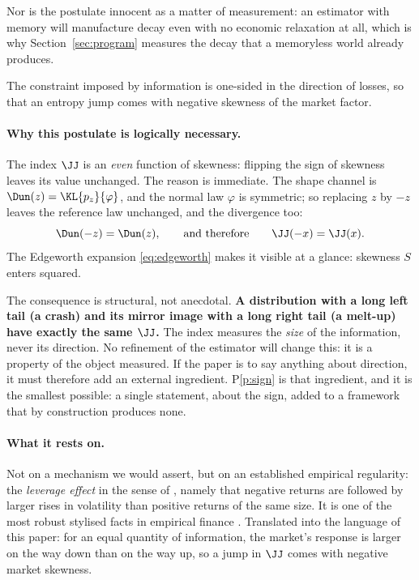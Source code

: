 Nor is the postulate innocent as a matter of measurement: an estimator with
memory will manufacture decay even with no economic relaxation at all, which is
why Section~\ref{sec:program} measures the decay that a memoryless world already
produces.

\begin{postulate}
\label{p:sign}
The constraint imposed by information is one-sided in the direction of losses,
so that an entropy jump comes with negative skewness of the market factor.
\end{postulate}

\paragraph{Why this postulate is logically necessary.} The index $\JJ$ is an
\emph{even} function of skewness: flipping the sign of skewness leaves its value
unchanged. The reason is immediate. The shape channel is
$\Dun(z)=\KL{p_z}{\varphi}$, and the normal law $\varphi$ is symmetric; so
replacing $z$ by $-z$ leaves the reference law unchanged, and the divergence too:
\begin{equation}
\label{eq:even}
\Dun(-z)=\Dun(z),\qquad\text{and therefore}\qquad \JJ(-x)=\JJ(x).
\end{equation}
The Edgeworth expansion \eqref{eq:edgeworth} makes it visible at a glance:
skewness $S$ enters squared.

The consequence is structural, not anecdotal. \textbf{A distribution with a long
left tail (a crash) and its mirror image with a long right tail (a melt-up) have
exactly the same $\JJ$.} The index measures the \emph{size} of the information,
never its direction. No refinement of the estimator will change this: it is a
property of the object measured. If the paper is to say anything about direction,
it must therefore add an external ingredient. P\ref{p:sign} is that ingredient,
and it is the smallest possible: a single statement, about the sign, added to a
framework that by construction produces none.

\paragraph{What it rests on.} Not on a mechanism we would assert, but on an
established empirical regularity: the \emph{leverage effect} in the sense of
\citet{black1976}, namely that negative returns are followed by larger rises in
volatility than positive returns of the same size. It is one of the most robust
stylised facts in empirical finance \citep{christie1982,engle1993,nelson1991}.
Translated into the language of this paper: for an equal quantity of
information, the market's response is larger on the way down than on the way up,
so a jump in $\JJ$ comes with negative market skewness.

